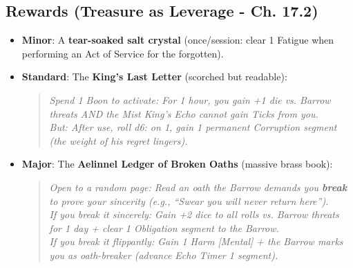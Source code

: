\documentclass[12pt]{article}
\begin{document}
\subsection{Rewards (Treasure as Leverage - Ch. 17.2)}
\begin{itemize}
  \item \textbf{Minor}: A \textbf{tear-soaked salt crystal} (once/session: clear 1 Fatigue when performing an Act of Service for the forgotten).
  \item \textbf{Standard}: The \textbf{King's Last Letter} (scorched but readable):
  \begin{quote}
    \textit{Spend 1 Boon to activate: For 1 hour, you gain +1 die vs. Barrow threats AND the Mist King's Echo cannot gain Ticks from you. \\ 
    But: After use, roll d6: on 1, gain 1 permanent Corruption segment (the weight of his regret lingers).}
  \end{quote}
  \item \textbf{Major}: The \textbf{Aelinnel Ledger of Broken Oaths} (massive brass book):
  \begin{quote}
    \textit{Open to a random page: Read an oath the Barrow demands you \textbf{break} to prove your sincerity (e.g., ``Swear you will never return here''). \\ 
    If you break it sincerely: Gain +2 dice to all rolls vs. Barrow threats for 1 day + clear 1 Obligation segment to the Barrow. \\ 
    If you break it flippantly: Gain 1 Harm [Mental] + the Barrow marks you as oath-breaker (advance Echo Timer 1 segment).}
  \end{quote}
\end{itemize}
\end{document}
